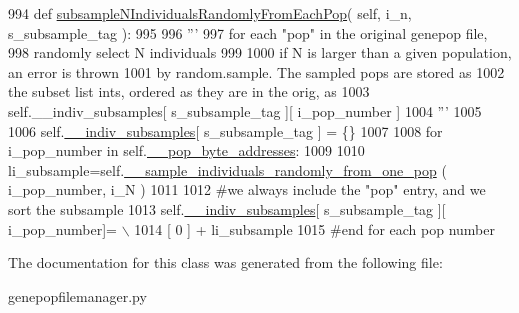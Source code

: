 \begin{DoxyCode}
994     \textcolor{keyword}{def }\hyperlink{classnegui_1_1genepopfilemanager_1_1GenepopFileManager_affaeb9457d84736dc1f289d600808f56}{subsampleNIndividualsRandomlyFromEachPop}( self, i\_n, 
      s\_subsample\_tag ):
995 
996         \textcolor{stringliteral}{'''}
997 \textcolor{stringliteral}{        for each "pop" in the original genepop file,}
998 \textcolor{stringliteral}{        randomly select N individuals}
999 \textcolor{stringliteral}{        }
1000 \textcolor{stringliteral}{        if N is larger than a given population, an error is thrown}
1001 \textcolor{stringliteral}{        by random.sample.  The sampled pops are stored as }
1002 \textcolor{stringliteral}{        the subset list ints, ordered as they are in the orig, as       }
1003 \textcolor{stringliteral}{        self.\_\_indiv\_subsamples[ s\_subsample\_tag ][ i\_pop\_number ]}
1004 \textcolor{stringliteral}{        '''}
1005 
1006         self.\hyperlink{classnegui_1_1genepopfilemanager_1_1GenepopFileManager_a1e8379bcee4902ca9314ff53fcb71644}{\_\_indiv\_subsamples}[ s\_subsample\_tag ] = \{\}
1007 
1008         \textcolor{keywordflow}{for} i\_pop\_number \textcolor{keywordflow}{in} self.\hyperlink{classnegui_1_1genepopfilemanager_1_1GenepopFileManager_ae24c2bdd19136a345bdb42fd49c5d91f}{\_\_pop\_byte\_addresses}:
1009             
1010             li\_subsample=self.\hyperlink{classnegui_1_1genepopfilemanager_1_1GenepopFileManager_a9818467c9cb40f8e1de0c6cc7f52e263}{\_\_sample\_individuals\_randomly\_from\_one\_pop}
      ( i\_pop\_number, i\_N )
1011 
1012             \textcolor{comment}{#we always include the "pop" entry, and we sort the subsample}
1013             self.\hyperlink{classnegui_1_1genepopfilemanager_1_1GenepopFileManager_a1e8379bcee4902ca9314ff53fcb71644}{\_\_indiv\_subsamples}[ s\_subsample\_tag ][ i\_pop\_number]= \(\backslash\)
1014                      [ 0 ] +  li\_subsample
1015         \textcolor{comment}{#end for each pop number}
\end{DoxyCode}


The documentation for this class was generated from the following file\+:\begin{DoxyCompactItemize}
\item 
genepopfilemanager.\+py\end{DoxyCompactItemize}
